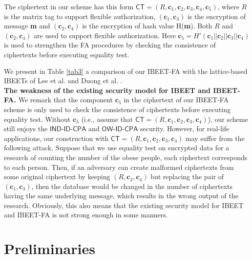 \documentclass[runningheads,10pt]{llncs}
\def\bf{\mathbf}
\def\CT{\mathsf{CT}}
\def\OW{\textsf{OW-ID-CPA}}
\def\IND{\textsf{IND-ID-CPA}}
\def\c{\bf{c}}
\def\ID{\mathsf{ID}}
\begin{document}
The ciphertext in our scheme has this form $\CT = (R,\c_1,\c_2,\c_3,\c_4,\c_5)$, where $R$ is the matrix tag to support flexible authorization, $(\c_1, \c_3)$ is the encryption of message \textbf{m} and $(\c_2, \c_4)$ is the encryption of hash value H(\textbf{m}). Both $R$ and $(\c_2, \c_4)$ are used to support flexible authorization. Here $\c_5=H'(\c_1||\c_2||\c_3||\c_4)$ is used to strengthen the FA procedures by checking  the consistence of ciphertexts before executing equality test. 

We present in Table \ref{tab3} a comparison of our \textsf{IBEET-FA} with the lattice-based IBEETs of  Lee et al. \cite{Lee2016} and Duong et al.  \cite{IBEET-Duong19}. \\

\noindent \textbf{The weakness of the existing security model for IBEET and IBEET-FA.} We remark that the component $\c_5$ in the ciphertext of our IBEET-FA scheme is only used to  check the consistence of ciphertexts before executing equality test. Without $\c_5$ (i.e., assume that $\CT = (R,\c_1,\c_2,\c_3,\c_4)$),  our scheme still enjoys the $\IND$ and $\OW$ security. However, for real-life applications, our construction with $\CT = (R,\c_1,\c_2,\c_3,\c_4)$ may suffer from the following attack. 
Suppose that we use equality test on encrypted data for a research of counting the number of the obese people, each ciphertext corresponds to each person. Then, if an adversary can create malformed ciphertexts from some original ciphertext by keeping $(R, \c_2,\c_4)$ but replacing the pair of $(\c_1,\c_3)$, then the database would be changed in the number of ciphertexts having the same underlying message, which results in the wrong output of the research. Obviously, this also means that the existing security model for IBEET and IBEET-FA is not strong enough in some manners.

\section{Preliminaries}\label{sec:prelim}
\end{document}
